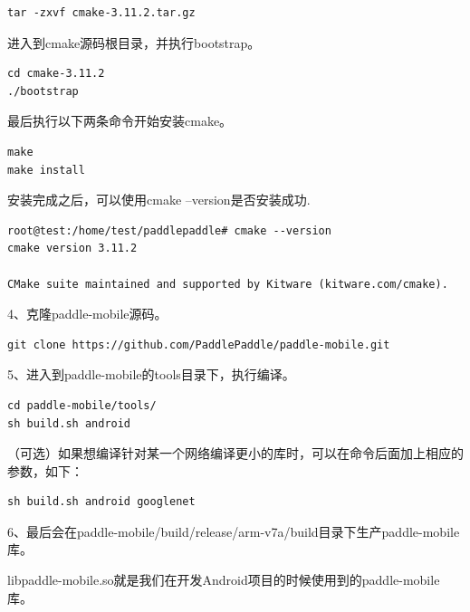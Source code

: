 \begin{verbatim}
tar -zxvf cmake-3.11.2.tar.gz
\end{verbatim}

进入到cmake源码根目录，并执行bootstrap。

\begin{verbatim}
cd cmake-3.11.2
./bootstrap
\end{verbatim}

最后执行以下两条命令开始安装cmake。

\begin{verbatim}
make
make install
\end{verbatim}

安装完成之后，可以使用cmake --version是否安装成功.

\begin{verbatim}
root@test:/home/test/paddlepaddle# cmake --version
cmake version 3.11.2

CMake suite maintained and supported by Kitware (kitware.com/cmake).
\end{verbatim}

4、克隆paddle-mobile源码。

\begin{verbatim}
git clone https://github.com/PaddlePaddle/paddle-mobile.git
\end{verbatim}

5、进入到paddle-mobile的tools目录下，执行编译。

\begin{verbatim}
cd paddle-mobile/tools/
sh build.sh android
\end{verbatim}

（可选）如果想编译针对某一个网络编译更小的库时，可以在命令后面加上相应的参数，如下：

\begin{verbatim}
sh build.sh android googlenet
\end{verbatim}

6、最后会在paddle-mobile/build/release/arm-v7a/build目录下生产paddle-mobile库。

\begin{Shaded}
\begin{Highlighting}[]
\end{Highlighting}
\end{Shaded}

libpaddle-mobile.so就是我们在开发Android项目的时候使用到的paddle-mobile库。

